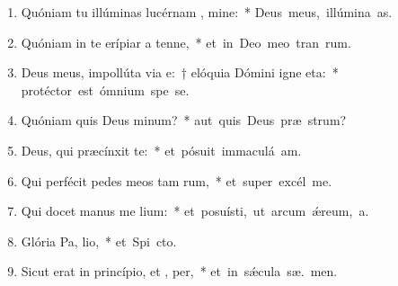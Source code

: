 \begin{flushleft}
\begin{enumerate}[leftmargin=*]
\item Quóniam tu illúminas lucérnam , mine:~* \mbox{Deus meus, illúmina  as.}
\item Quóniam in te erípiar a tenne,~* \mbox{et in Deo meo tran rum.}
\item Deus meus, impollúta via e:~† elóquia Dómini igne eta:~* \mbox{protéctor est ómnium spe  se.}
\item Quóniam quis Deus  minum?~* \mbox{aut quis Deus præ  strum?}
\item Deus, qui præcínxit  te:~* \mbox{et pósuit immaculá  am.}
\item Qui perfécit pedes meos tam rum,~* \mbox{et super excél  me.}
\item Qui docet manus me  lium:~* \mbox{et posuísti, ut arcum \'{\ae}reum,  a.}
\item Glória Pa,  lio,~* \mbox{et Spi cto.}
\item Sicut erat in princípio, et ,  per,~* \mbox{et in s\'{\ae}cula sæ. men.}

\end{enumerate}
\end{flushleft}

